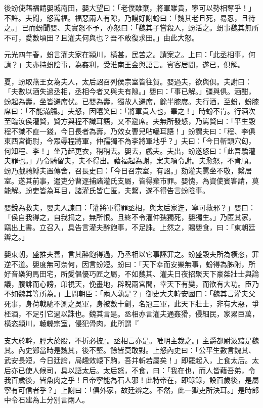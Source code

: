\begin{pinyinscope}
後蚡使藉福請嬰城南田，嬰大望曰：「老僕雖棄，將軍雖貴，寧可以勢相奪乎！」不許。夫聞，怒罵福。福惡兩人有隙，乃謾好謝蚡曰：「魏其老且死，易忍，且待之。」已而蚡聞嬰、夫實怒不予，亦怒曰：「魏其子嘗殺人，蚡活之。蚡事魏其無所不可，愛數頃田？且灌夫何與也？吾不敢復求田。」由此大怒。

元光四年春，蚡言灌夫家在潁川，橫甚，民苦之。請案之。上曰：「此丞相事，何請？」夫亦持蚡陰事，為姦利，受淮南王金與語言。賓客居間，遂已，俱解。

夏，蚡取燕王女為夫人，太后詔召列侯宗室皆往賀。嬰過夫，欲與俱。夫謝曰：「夫數以酒失過丞相，丞相今者又與夫有隙。」嬰曰：「事已解。」彊與俱。酒酣，蚡起為壽，坐皆避席伏。已嬰為壽，獨故人避席，餘半膝席。夫行酒，至蚡，蚡膝席曰：「不能滿觴。」夫怒，因嘻笑曰：「將軍貴人也，畢之！」時蚡不肯。行酒次至臨汝侯灌賢，賢方與程不識耳語，又不避席。夫無所發怒，乃罵賢曰：「平生毀程不識不直一錢，今日長者為壽，乃效女曹兒呫囁耳語！」蚡謂夫曰：「程、李俱東西宮衛尉，今眾辱程將軍，仲孺獨不為李將軍地乎？」夫曰：「今日斬頭穴匈，何知程、李！」坐乃起更衣，稍稍去。嬰去，戲夫。夫出，蚡遂怒曰：「此吾驕灌夫罪也。」乃令騎留夫，夫不得出。藉福起為謝，案夫項令謝。夫愈怒，不肯順。蚡乃戲騎縛夫置傳舍，召長史曰：「今日召宗室，有詔。」劾灌夫罵坐不敬，繫居室。遂其前事，遣吏分曹逐捕諸灌氏支屬，皆得棄巿罪。嬰愧，為資使賓客請，莫能解。蚡吏皆為耳目，諸灌氏皆亡匿，夫繫，遂不得告言蚡陰事。

嬰銳為救夫，嬰夫人諫曰：「灌將軍得罪丞相，與太后家迕，寧可救邪？」嬰曰：「侯自我得之，自我捐之，無所恨。且終不令灌仲孺獨死，嬰獨生。」乃匿其家，竊出上書。立召入，具告言灌夫醉飽事，不足誅。上然之，賜嬰食，曰：「東朝廷辯之。」

嬰東朝，盛推夫善，言其醉飽得過，乃丞相以它事誣罪之。蚡盛毀夫所為橫恣，罪逆不道。嬰度無可奈何，因言蚡短。蚡曰：「天下幸而安樂無事，蚡得為胏附，所好音樂狗馬田宅，所愛倡優巧匠之屬，不如魏其、灌夫日夜招聚天下豪桀壯士與論議，腹誹而心謗，卬視天，俛畫地，辟睨兩宮間，幸天下有變，而欲有大功。臣乃不如魏其等所為。」上問朝臣：「兩人孰是？」御史大夫韓安國曰：「魏其言灌夫父死事，身荷戟馳不測之吳軍，身被數十創，名冠三軍，此天下壯士，非有大惡，爭柸酒，不足引它過以誅也。魏其言是。丞相亦言灌夫通姦猾，侵細民，家累巨萬，橫恣潁川，輘轢宗室，侵犯骨肉，此所謂『

支大於幹，脛大於股，不折必披』。丞相言亦是。唯明主裁之。」主爵都尉汲黯是魏其。內史鄭當時是魏其，後不堅。餘皆莫敢對。上怒內史曰：「公平生數言魏其、武安長短，今日廷論，局趣效轅下駒，吾并斬若屬矣！」即罷起入，上食太后。太后亦已使人候司，具以語太后。太后怒，不食，曰：「我在也，而人皆藉吾弟，令我百歲後，皆魚肉之乎！且帝寧能為石人邪！此特帝在，即錄錄，設百歲後，是屬寧有可信者乎？」上謝曰：「俱外家，故廷辨之。不然，此一獄吏所決耳。」是時郎中令石建為上分別言兩人。


\end{pinyinscope}
